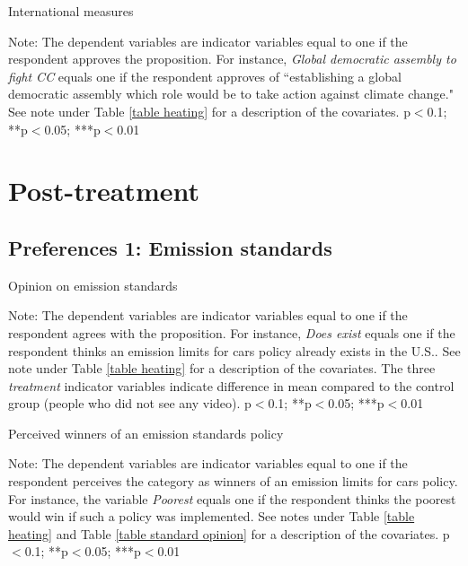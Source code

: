 \documentclass{article}
\begin{document}
\begin{landscape}
	\begin{table}[h!]
	\caption{International measures}
	\begin{center}
		\scalebox{0.6}{}
	\end{center}
	{\footnotesize Note: The dependent variables are indicator variables equal to one if the respondent approves the proposition. For instance, \textit{Global democratic assembly to fight CC} equals one if the respondent approves of ``establishing a global democratic assembly which role would be to take action against climate change." See note under Table \ref{table heating} for a description of the covariates.
	\newline *p$<$0.1; **p$<$0.05; ***p$<$0.01}
\end{table}	
\end{landscape}


\clearpage
\section{Post-treatment}
\subsection{Preferences 1: Emission standards}

\begin{table}[h!]
	\caption{Opinion on emission standards} \label{table standard opinion}
	\begin{center}
		\scalebox{0.7}{}
	\end{center}
	{\footnotesize Note: The dependent variables are indicator variables equal to one if the respondent agrees with the proposition. For instance, \textit{Does exist} equals one if the respondent thinks an emission limits for cars policy already exists in the U.S.. See note under Table \ref{table heating} for a description of the covariates. The three \textit{treatment} indicator variables indicate difference in mean compared to the control group (people who did not see any video).
	\newline *p$<$0.1; **p$<$0.05; ***p$<$0.01}
\end{table}	

\begin{table}[h!]
	\caption{Perceived winners of an emission standards policy}
	\begin{center}
		\scalebox{0.7}{}
	\end{center}
	{\footnotesize Note: The dependent variables are indicator variables equal to one if the respondent perceives the category as winners of an emission limits for cars policy. For instance, the variable \textit{Poorest} equals one if the respondent thinks the poorest would win if such a policy was implemented. See notes under Table \ref{table heating} and Table \ref{table standard opinion} for a description of the covariates.
	\newline *p$<$0.1; **p$<$0.05; ***p$<$0.01}
\end{table}	
\end{document}
